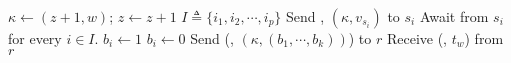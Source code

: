 \begin{algorithm*}[!h]
	\begin{algorithmic}[2]
		\begin{multicols}{2}{\footnotesize
				\EndPart
				\Statex\Statex
				{\bf  {}}
				\Part{ \underline{\writeValue}} {
					\State ${\kappa} \leftarrow (z +1,  w)$; $z \leftarrow z +1 $
					\State $I\triangleq \{i_1, i_2, \cdots, i_p \}$
					\State Send \writeValueTag, $({\kappa}, v_{s_i})$ to  $s_i$
					\EndFor 
					\State  Await {\ackTag}  from  $s_i$ for every $i \in I$.
				}\EndPart
				\Statex
				\Part{ \underline{\informReader}} {
					\State $b_i \leftarrow 1$
					\Else
					\State $b_i \leftarrow 0$
					\EndIf
					\EndFor 
					\State  Send  (\informReaderTag, $({\kappa}, (b_{1}, \cdots, b_{k}))$) to   $r$
					\State  Receive ({\ackTag}, $t_w$) from  $r$
				}\EndPart
		}\end{multicols}	
		\\\hrulefill 	%
		\begin{multicols}{2}{\footnotesize	
				\EndPart
				
}
\end{multicols}
\end{algorithmic}
\end{algorithm*}
